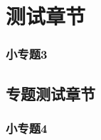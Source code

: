 \documentclass[color=green]{textbook-cn}%
\begin{document}
\zhlipsum\zhlipsum

\part[宝贝]{测试章节}


\lipsum

\begin{Definition}
\lipsum[2]
\end{Definition}





\begin{Topic}

\section{小专题3}
\chapter{专题测试章节}
\section{小专题4}

\end{Topic}













\end{document}
